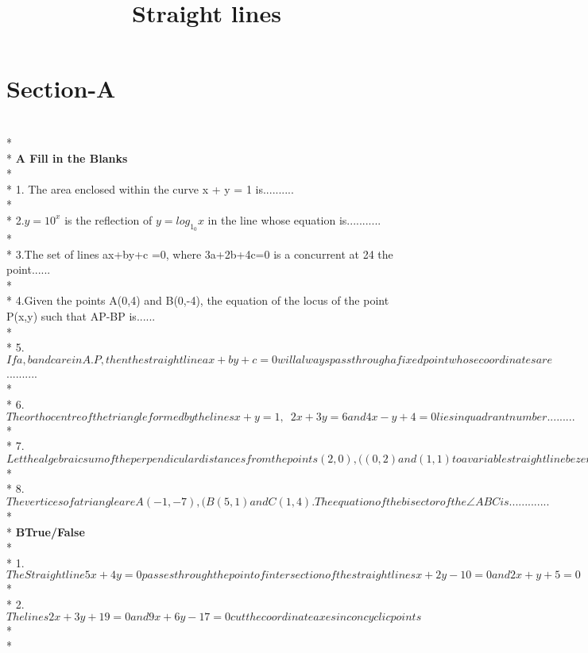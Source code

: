 \documentclass{article}
\title{Straight lines}
\begin{document}
\maketitle

\section{\LARGE Section-A}\\*\\*
{\Large\textbf {A Fill in the Blanks}}\\*\\* 
{\large 1. The area enclosed within the curve \vert x \vert + \vert y \vert = 1 \enspace is..........\\*\\*
2.\enspace $y=10^x$ is the reflection of $y=log_1_0x$ in the line whose equation is...........\\*\\*
3.\enspace The set of lines ax+by+c =0, where 3a+2b+4c=0 is a concurrent at 
24
 the point......\\*\\*
4.\enspace Given the points A(0,4) and B(0,-4), the equation of the locus of the point P(x,y) such that \vert AP-BP  \enspace is......\\*\\*
5.\enspace $If a,b and c are in A.P,then the straight line ax+by+c=0 will always pass through a fixed point whose coordinates are$..........\\*\\*
6.\enspace $The orthocentre of the triangle formed by the lines x+y=1,\enspace 2x+3y=6 and 4x-y+4=0 lies in quadrant number .........$\\*\\*
7.\enspace $Let the algebraic sum of the perpendicular distances from the points (2,0),((0,2) and (1,1) to a variable straight line be zero; then the line passes through a fixed points whose coordinates are .........$\\*\\*
8.\enspace $The vertices of a triangle are A(-1,-7),(B(5,1) and C(1,4). The equation of the bisector of the \angle ABC is .............$\\*\\*}
{\Large \textbf{B\enspace True/False}}\\*\\* 
{\large 1. $The Straight line 5x+4y =0 passes through the point of intersection of the straight lines x+2y-10=0 and 2x+y+5=0$\\*\\*
2.\enspace $The lines 2x+3y+19=0 and 9x+6y-17=0 cut the coordinate axes in concyclic points$\\*\\*
}
\end{document}

